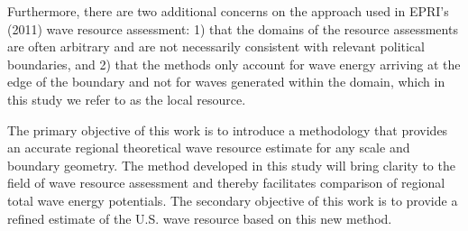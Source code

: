 Furthermore, there are two additional concerns on the approach used in EPRI’s (2011) wave resource assessment: 1) that the domains of the resource assessments are often arbitrary and are not necessarily consistent with relevant political boundaries, and 2) that the methods only account for wave energy arriving at the edge of the boundary and not for waves generated within the domain, which in this study we refer to as the local resource.

The primary objective of this work is to introduce a methodology that provides an accurate regional theoretical wave resource estimate for any scale and boundary geometry. The method developed in this study will bring clarity to the field of wave resource assessment and thereby facilitates comparison of regional total wave energy potentials. The secondary objective of this work is to provide a refined estimate of the U.S. wave resource based on this new method.
